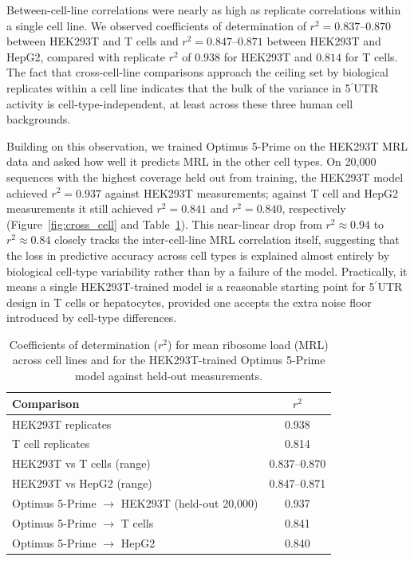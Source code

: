 \documentclass[11pt]{article}
\begin{document}
Between-cell-line correlations were nearly as high as replicate correlations
within a single cell line. We observed coefficients of determination of
$r^{2} = 0.837$--$0.870$ between HEK293T and T cells and
$r^{2} = 0.847$--$0.871$ between HEK293T and HepG2, compared with replicate
$r^{2}$ of $0.938$ for HEK293T and $0.814$ for T cells. The fact that
cross-cell-line comparisons approach the ceiling set by biological replicates
within a cell line indicates that the bulk of the variance in 5$^\prime$UTR
activity is cell-type-independent, at least across these three human cell
backgrounds.

Building on this observation, we trained Optimus 5-Prime on the HEK293T MRL
data and asked how well it predicts MRL in the other cell types. On 20{,}000
sequences with the highest coverage held out from training, the HEK293T model
achieved $r^{2} = 0.937$ against HEK293T measurements; against T cell and
HepG2 measurements it still achieved $r^{2} = 0.841$ and $r^{2} = 0.840$,
respectively (Figure~\ref{fig:cross_cell} and Table~\ref{tab:cross_cell}).
This near-linear drop from $r^{2} \approx 0.94$ to $r^{2} \approx 0.84$
closely tracks the inter-cell-line MRL correlation itself, suggesting that
the loss in predictive accuracy across cell types is explained almost
entirely by biological cell-type variability rather than by a failure of the
model. Practically, it means a single HEK293T-trained model is a reasonable
starting point for 5$^\prime$UTR design in T cells or hepatocytes, provided
one accepts the extra noise floor introduced by cell-type differences.

\begin{table}[htbp]
\centering
\caption{Coefficients of determination ($r^{2}$) for mean ribosome load
(MRL) across cell lines and for the HEK293T-trained Optimus 5-Prime
model against held-out measurements.}
\label{tab:cross_cell}
\begin{tabular}{lc}
\toprule
Comparison & $r^{2}$ \\
\midrule
HEK293T replicates & 0.938 \\
T cell replicates & 0.814 \\
HEK293T vs T cells (range) & 0.837--0.870 \\
HEK293T vs HepG2 (range) & 0.847--0.871 \\
\midrule
Optimus 5-Prime $\to$ HEK293T (held-out 20{,}000) & 0.937 \\
Optimus 5-Prime $\to$ T cells & 0.841 \\
Optimus 5-Prime $\to$ HepG2 & 0.840 \\
\bottomrule
\end{tabular}
\end{table}
\end{document}
